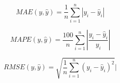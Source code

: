 \begin{equation}
    MAE(y, \hat{y}) = \frac{1}{n} \sum_{i=1}^{n} \left| y_i - \hat{y}_i \right|\label{eq:mae}
\end{equation}

\begin{equation}
    MAPE(y, \hat{y}) = \frac{100}{n} \sum_{i=1}^{n} \left| \frac{y_i - \hat{y}_i}{y_i} \right|\label{eq:mape}
\end{equation}

\begin{equation}
    RMSE(y, \hat{y}) = \sqrt{\frac{1}{n} \sum_{i=1}^{n} \left( y_i - \hat{y}_i \right)^2}|\label{eq:rmse}
\end{equation}